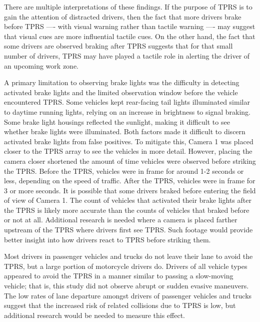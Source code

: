 \documentclass[
  letterpaper,
]{trb}
\begin{document}
There are multiple interpretations of these findings. If the purpose of
TPRS is to gain the attention of distracted drivers, then the fact that
more drivers brake before TPRS ---- with visual warning rather than
tactile warning ---- may suggest that visual cues are more influential
tactile cues. On the other hand, the fact that some drivers are observed
braking after TPRS suggests that for that small number of drivers, TPRS
may have played a tactile role in alerting the driver of an upcoming
work zone.

A primary limitation to observing brake lights was the difficulty in
detecting activated brake lights and the limited observation window
before the vehicle encountered TPRS. Some vehicles kept rear-facing tail
lights illuminated similar to daytime running lights, relying on an
increase in brightness to signal braking. Some brake light housings
reflected the sunlight, making it difficult to see whether brake lights
were illuminated. Both factors made it difficult to discern activated
brake lights from false positives. To mitigate this, Camera 1 was placed
closer to the TPRS array to see the vehicles in more detail. However,
placing the camera closer shortened the amount of time vehicles were
observed before striking the TPRS. Before the TPRS, vehicles were in
frame for around 1-2 seconds or less, depending on the speed of traffic.
After the TPRS, vehicles were in frame for 3 or more seconds. It is
possible that some drivers braked before entering the field of view of
Camera 1. The count of vehicles that activated their brake lights after
the TPRS is likely more accurate than the counts of vehicles that braked
before or not at all. Additional research is needed where a camera is
placed farther upstream of the TPRS where drivers first see TPRS. Such
footage would provide better insight into how drivers react to TPRS
before striking them.

Most drivers in passenger vehicles and trucks do not leave their lane to
avoid the TPRS, but a large portion of motorcycle drivers do. Drivers of
all vehicle types appeared to avoid the TPRS in a manner similar to
passing a slow-moving vehicle; that is, this study did not observe
abrupt or sudden evasive maneuvers. The low rates of lane departure
amongst drivers of passenger vehicles and trucks suggest that the
increased risk of related collisions due to TPRS is low, but additional
research would be needed to measure this effect.
\end{document}
